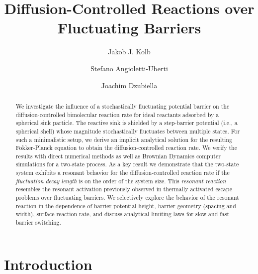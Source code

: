 \documentclass[preprint,superscriptaddress]{revtex4-1}
\begin{document}
 


\title{Diffusion-Controlled Reactions over Fluctuating Barriers} 

\author{Jakob J. Kolb}
\author{Stefano Angioletti-Uberti}
\author{Joachim Dzubiella}



\begin{abstract}


We investigate the influence of a stochastically fluctuating potential barrier on the diffusion-controlled bimolecular reaction rate
for ideal reactants adsorbed by a spherical sink particle.  The reactive sink is shielded by a step-barrier potential (i.e., a spherical shell)  
whose magnitude stochastically fluctuates between multiple states. For such a minimalistic setup, we derive an implicit analytical 
solution for the resulting Fokker-Planck equation to obtain the diffusion-controlled reaction rate.  We verify the results with direct numerical 
methods as well as Brownian Dynamics computer simulations for a two-state process. As a key result we demonstrate that the two-state 
system exhibits  a resonant  behavior for the diffusion-controlled reaction rate if the {\it fluctuation decay length} is on the order of the system size.  
This {\it resonant reaction} resembles the resonant activation previously observed in thermally activated escape problems 
over fluctuating barriers. We selectively explore the behavior of the resonant reaction in the dependence of barrier potential height, 
barrier geometry (spacing and width), surface reaction rate,  and discuss analytical limiting laws for slow and fast barrier switching. 

\end{abstract}

\maketitle

\section{Introduction}
\end{document}
